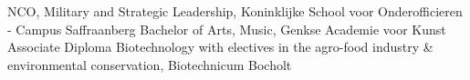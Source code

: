 %
%
%


\begin{scholarship}
					{NCO, Military and Strategic Leadership, Koninklijke School voor Onderofficieren - Campus Saffraanberg}
					{Bachelor of Arts, Music, Genkse Academie voor Kunst}
					{Associate Diploma Biotechnology with electives in the agro-food industry \& environmental conservation, Biotechnicum Bocholt}
\end{scholarship}